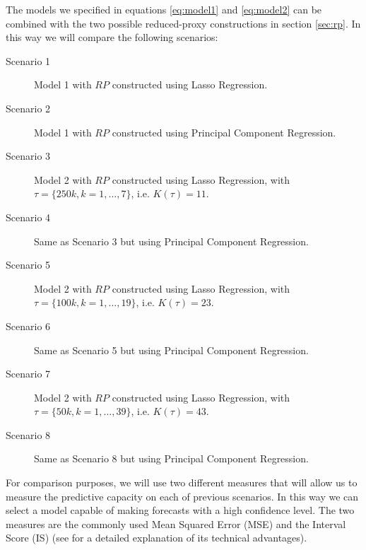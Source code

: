 \documentclass[11pt]{amsart}
\theoremstyle{plain}
\theoremstyle{definition}
\theoremstyle{remark}
\begin{document}
The models we specified in equations \eqref{eq:model1} and \eqref{eq:model2} can
be combined with the two possible reduced-proxy constructions in section
\ref{sec:rp}. In this way we will compare the following scenarios:
\begin{description}
\item[Scenario 1] Model 1 with $RP$ constructed using Lasso Regression.
  
\item[Scenario 2] Model 1 with $RP$ constructed using Principal Component
  Regression.
  
\item[Scenario 3] Model 2 with $RP$ constructed using Lasso Regression, with
  $\tau=\{250 k, k=1,\ldots,7\}$, i.e. $K(\tau)=11$.

\item[Scenario 4] Same as Scenario 3 but using Principal Component Regression.

\item[Scenario 5] Model 2 with $RP$ constructed using Lasso Regression, with
  $\tau=\{100 k, k=1,\ldots,19\}$, i.e. $K(\tau)=23$.

\item[Scenario 6] Same as Scenario 5 but using Principal Component Regression.

\item[Scenario 7] Model 2 with $RP$ constructed using Lasso Regression, with
  $\tau=\{50 k, k=1,\ldots,39\}$, i.e. $K(\tau)=43$.

\item[Scenario 8] Same as Scenario 8 but using Principal Component Regression.
\end{description}
For comparison purposes, we will use two different measures that will allow us
to measure the predictive capacity on each of previous scenarios. In this way we
can select a model capable of making forecasts with a high confidence level. The
two measures are the commonly used Mean Squared Error (MSE) and the Interval
Score (IS) (see \cite{Gneiting2007a} for a detailed explanation of its technical
advantages).
\end{document}
